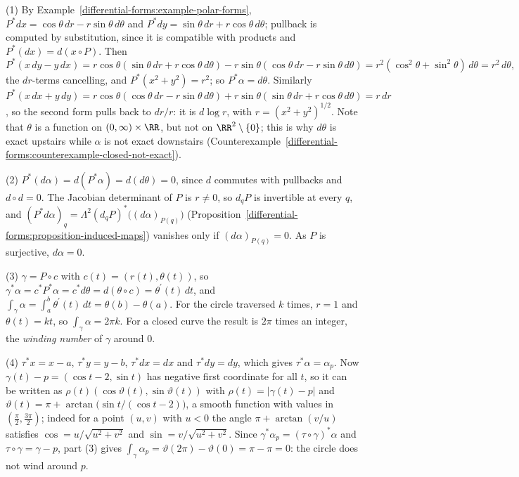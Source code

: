 \begin{solution}
(1) By Example~\ref{differential-forms:example-polar-forms}, $P^*dx = \cos\theta\,dr - r\sin\theta\,d\theta$ and $P^*dy = \sin\theta\,dr + r\cos\theta\,d\theta$; pullback is computed by substitution, since it is
compatible with products and $P^*(dx) = d(x \circ P)$. Then
\[
P^*(x\,dy - y\,dx) = r\cos\theta(\sin\theta\,dr + r\cos\theta\,d\theta) - r\sin\theta(\cos\theta\,dr - r\sin\theta\,d\theta) = r^2(\cos^2\theta + \sin^2\theta)\,d\theta = r^2\,d\theta,
\]
the $dr$-terms cancelling, and $P^*(x^2 + y^2) = r^2$; so $P^*\alpha = d\theta$. Similarly
$P^*(x\,dx + y\,dy) = r\cos\theta(\cos\theta\,dr - r\sin\theta\,d\theta) + r\sin\theta(\sin\theta\,dr + r\cos\theta\,d\theta) = r\,dr$, so the second form pulls back to $dr/r$: it is $d\log r$, with
$r = (x^2 + y^2)^{1/2}$. Note that $\theta$ is a function on $(0, \infty) \times \RR$, but not on $\RR^2 \setminus \{0\}$; this is why $d\theta$ is exact upstairs while $\alpha$ is not exact downstairs
(Counterexample~\ref{differential-forms:counterexample-closed-not-exact}).

(2) $P^*(d\alpha) = d(P^*\alpha) = d(d\theta) = 0$, since $d$ commutes with pullbacks and $d \circ d = 0$. The Jacobian determinant of $P$ is $r \neq 0$, so $d_qP$ is invertible at every $q$, and
$(P^*d\alpha)_q = \Lambda^2(d_qP)^*\bigl((d\alpha)_{P(q)}\bigr)$ (Proposition~\ref{differential-forms:proposition-induced-maps}) vanishes only if $(d\alpha)_{P(q)} = 0$. As $P$ is surjective, $d\alpha = 0$.

(3) $\gamma = P \circ c$ with $c(t) = (r(t), \theta(t))$, so $\gamma^*\alpha = c^*P^*\alpha = c^*d\theta = d(\theta \circ c) = \theta^{\prime}(t)\,dt$, and $\int_\gamma\alpha = \int_a^b\theta^{\prime}(t)\,dt = \theta(b) - \theta(a)$. For the
circle traversed $k$ times, $r = 1$ and $\theta(t) = kt$, so $\int_\gamma\alpha = 2\pi k$. For a closed curve the result is $2\pi$ times an integer, the \emph{winding number} of $\gamma$ around $0$.

(4) $\tau^*x = x - a$, $\tau^*y = y - b$, $\tau^*dx = dx$ and $\tau^*dy = dy$, which gives $\tau^*\alpha = \alpha_p$. Now $\gamma(t) - p = (\cos t - 2, \sin t)$ has negative first coordinate for all $t$, so it can be written
as $\rho(t)(\cos\vartheta(t), \sin\vartheta(t))$ with $\rho(t) = |\gamma(t) - p|$ and $\vartheta(t) = \pi + \arctan\bigl(\sin t/(\cos t - 2)\bigr)$, a smooth function with values in $(\frac\pi2, \frac{3\pi}2)$; indeed for a point
$(u, v)$ with $u < 0$ the angle $\pi + \arctan(v/u)$ satisfies $\cos = u/\sqrt{u^2 + v^2}$ and $\sin = v/\sqrt{u^2 + v^2}$. Since $\gamma^*\alpha_p = (\tau \circ \gamma)^*\alpha$ and $\tau \circ \gamma = \gamma - p$, part (3)
gives $\int_\gamma\alpha_p = \vartheta(2\pi) - \vartheta(0) = \pi - \pi = 0$: the circle does not wind around $p$.
\end{solution}

